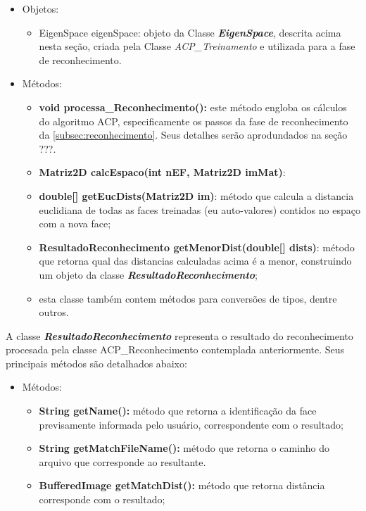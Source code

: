 \begin{itemize}	
		\item Objetos:
	\begin{itemize}
		\item EigenSpace eigenSpace: objeto da Classe \textbf{\textit{EigenSpace}}, descrita acima nesta seção, criada pela Classe \textit{ACP\_Treinamento} e utilizada para a fase de reconhecimento.
	\end{itemize}
	
	
	\item Métodos:
	\begin{itemize}
		\item \textbf{void processa\_Reconhecimento():} este método engloba os cálculos do algoritmo ACP, especificamente os passos da fase de reconhecimento da \autoref{subsec:reconhecimento}. Seus detalhes serão aprodundados na seção ???.
		
		\item \textbf{Matriz2D calcEspaco(int nEF, Matriz2D imMat)}:
		
		\item \textbf{double[] getEucDists(Matriz2D im)}: método que calcula a distancia euclidiana de todas as faces treinadas (eu auto-valores) contidos no espaço com a nova face;
		
		\item \textbf{ResultadoReconhecimento getMenorDist(double[] dists)}: método que retorna qual das distancias calculadas acima é a menor, construindo um objeto da classe \textit{\textbf{ResultadoReconhecimento}};
		
		\item esta classe também contem métodos para conversões de tipos, dentre outros.
		
		
	\end{itemize}
\end{itemize}



A classe \textit{\textbf{ResultadoReconhecimento}} representa o resultado do reconhecimento procesada pela classe ACP\_Reconhecimento contemplada anteriormente. Seus principais métodos são detalhados abaixo:


\begin{itemize}	
	\item Métodos:
	\begin{itemize}
		\item \textbf{String getName():} método que retorna a identificação da face previsamente informada pelo usuário, correspondente com o resultado;		
		\item \textbf{String getMatchFileName():} método que retorna o caminho do arquivo que corresponde ao resultante.
		\item \textbf{BufferedImage getMatchDist():} método que retorna distância corresponde com o resultado;
	\end{itemize}
\end{itemize}





